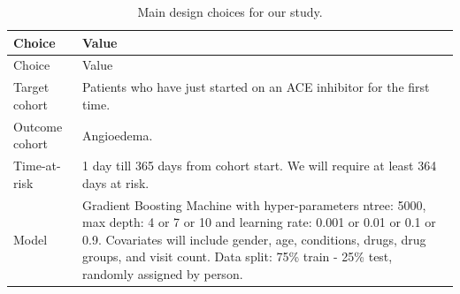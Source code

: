 \documentclass[11pt]{book}
\begin{document}
\begin{longtable}[]{@{}ll@{}}
\caption{\label{tab:plpSummary} Main design choices for our
study.}\tabularnewline
\toprule
\begin{minipage}[b]{0.23\columnwidth}\raggedright\strut
Choice\strut
\end{minipage} & \begin{minipage}[b]{0.71\columnwidth}\raggedright\strut
Value\strut
\end{minipage}\tabularnewline
\midrule
\endfirsthead
\toprule
\begin{minipage}[b]{0.23\columnwidth}\raggedright\strut
Choice\strut
\end{minipage} & \begin{minipage}[b]{0.71\columnwidth}\raggedright\strut
Value\strut
\end{minipage}\tabularnewline
\midrule
\endhead
\begin{minipage}[t]{0.23\columnwidth}\raggedright\strut
Target cohort\strut
\end{minipage} & \begin{minipage}[t]{0.71\columnwidth}\raggedright\strut
Patients who have just started on an ACE inhibitor for the first
time.\strut
\end{minipage}\tabularnewline
\begin{minipage}[t]{0.23\columnwidth}\raggedright\strut
Outcome cohort\strut
\end{minipage} & \begin{minipage}[t]{0.71\columnwidth}\raggedright\strut
Angioedema.\strut
\end{minipage}\tabularnewline
\begin{minipage}[t]{0.23\columnwidth}\raggedright\strut
Time-at-risk\strut
\end{minipage} & \begin{minipage}[t]{0.71\columnwidth}\raggedright\strut
1 day till 365 days from cohort start. We will require at least 364 days
at risk.\strut
\end{minipage}\tabularnewline
\begin{minipage}[t]{0.23\columnwidth}\raggedright\strut
Model\strut
\end{minipage} & \begin{minipage}[t]{0.71\columnwidth}\raggedright\strut
Gradient Boosting Machine with hyper-parameters ntree: 5000, max depth:
4 or 7 or 10 and learning rate: 0.001 or 0.01 or 0.1 or 0.9. Covariates
will include gender, age, conditions, drugs, drug groups, and visit
count. Data split: 75\% train - 25\% test, randomly assigned by
person.\strut
\end{minipage}\tabularnewline
\bottomrule
\end{longtable}
\end{document}

